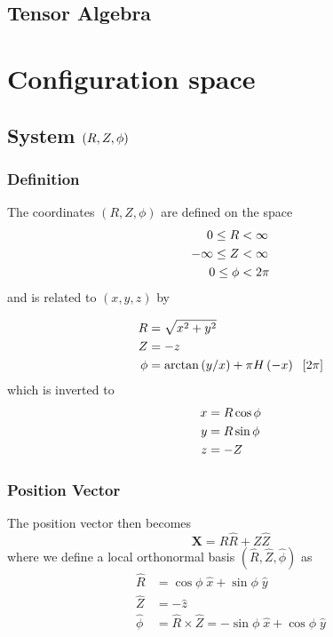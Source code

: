 \subsection{Tensor Algebra}

\section{Configuration space}

\subsection{System $\left( R,Z,\protect\phi\right) $}

\subsubsection{Definition}

The coordinates $\left( R,Z,\phi\right) $ are defined on the space 
\begin{align}
0\leq R & <\infty  \notag \\
-\infty\leq Z & <\infty  \notag \\
0\leq\phi & <2\pi
\end{align}
and is related to $\left( x,y,z\right) $ by

\begin{align}
R & =\sqrt{x^{2}+y^{2}}  \label{RZphidef} \\
Z & =-z  \notag \\
\phi & =\arctan\left( y/x\right) +\pi H\left( -x\right) \;\ \left[ 2\pi%
\right]  \notag
\end{align}
which is inverted to 
\begin{align}
x & =R\cos\phi \\
y & =R\sin\phi  \notag \\
z & =-Z  \notag
\end{align}

\subsubsection{Position Vector}

The position vector then becomes 
\begin{equation}
\mathbf{X}=R\widehat{R}+Z\widehat{Z}
\end{equation}
where we define a local orthonormal basis $\left( \widehat{R},\widehat {Z},%
\widehat{\phi}\right) $ as 
\begin{align}
\widehat{R} & =\cos\phi\;\widehat{x}+\sin\phi\;\widehat{y} \\
\widehat{Z} & =-\widehat{z} \\
\widehat{\phi} & =\widehat{R}\times\widehat{Z}=-\sin\phi\;\widehat{x}
+\cos\phi\;\widehat{y}
\end{align}

